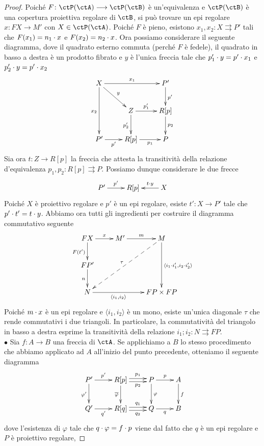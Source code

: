 \begin{proof}
 Poiché \(F \colon \ctP(\ctA) \fun \ctP(\ctB)\) è un'equivalenza e \(\ctP(\ctB)\) è una copertura proiettiva regolare di \(\ctB\), si può
 trovare un epi regolare \(x \colon FX \to M'\) con \(X \in \ctP(\ctA)\). Poiché \(F\) è pieno, esistono \(x_1, x_2 \colon X \rightrightarrows P'\)
 tali che \(F(x_1) = n_1 \cdot x\) e \(F(x_2) = n_2 \cdot x\). Ora possiamo considerare il seguente diagramma, dove il quadrato esterno
 commuta (perché \(F\) è fedele), il quadrato in basso a destra è un prodotto fibrato e \(y\) è l'unica freccia tale che
 \(p_1' \cdot y = p' \cdot x_1\) e \(p_2' \cdot y = p' \cdot x_2\)
 \[\xymatrix{X \ar[dd]_{x_2} \ar[rr]^-{x_1} \ar[rd]^{y} & & P' \ar[d]^{p'} \\
  & Z \ar[d]_{p_2'} \ar[r]^-{p_1'} & R[p] \ar[d]^{p_2} \\
  P' \ar[r]_-{p'} & R[p] \ar[r]_-{p_1} & P }\]
 Sia ora \(t \colon Z \to R[p]\) la freccia che attesta la transitività della relazione d'equivalenza \(p_1,p_2 \colon R[p] \rightrightarrows P\).
 Possiamo dunque considerare le due frecce
 \[\xymatrix{P' \ar[r]^-{p'} & R[p] & X \ar[l]_-{t \cmp y}}\]
 Poiché \(X\) è proiettivo regolare e \(p'\) è un epi regolare, esiste \(t' \colon X \to P'\) tale che \(p' \cdot t' = t \cdot y\). Abbiamo ora tutti
 gli ingredienti per costruire il diagramma commutativo seguente
 \[\xymatrix{FX \ar[r]^-{x} \ar[d]_{F(t')} & M' \ar[r]^-{m} & M \ar[dd]^{\langle i_1 \cmp i_1', i_2 \cmp i_2' \rangle} \ar@{-->}[lldd]_{\tau} \\
  FP' \ar[d]_{n} \\
  N \ar[rr]_-{\langle i_1,i_2 \rangle} & & FP \times FP }\]
 Poiché \(m \cdot x\) è un epi regolare e \(\langle i_1,i_2 \rangle\) è un mono, esiste un'unica diagonale \(\tau\) che rende commutativi
 i due triangoli. In particolare, la commutatività del triangolo in basso a destra esprime la transitività della relazione
 \(i_1;i_2 \colon N \rightrightarrows FP\). \\
 \(\bullet\) Sia \(f \colon A \to B\) una freccia di \(\ctA\). Se applichiamo a \(B\) lo stesso procedimento che abbiamo applicato ad \(A\)
 all'inizio del punto precedente, otteniamo il seguente diagramma
 \[\xymatrix{P' \ar[d]_{\varphi'} \ar[r]^-{p'} & R[p] \ar@<0.5ex>[r]^-{p_1} \ar@<-0.5ex>[r]_-{p_2} \ar[d]_{\overline{\varphi}}
  & P \ar[r]^-{p} \ar[d]^{\varphi} & A \ar[d]^{f} \\
  Q' \ar[r]_-{q'} & R[q] \ar@<0.5ex>[r]^-{q_1} \ar@<-0.5ex>[r]_-{q_2} & Q \ar[r]_{q} & B}\]
 dove l'esistenza di \(\varphi\) tale che \(q \cdot \varphi = f \cdot p\) viene dal fatto che \(q\) è un epi regolare e \(P\) è proiettivo regolare,

\end{proof}
